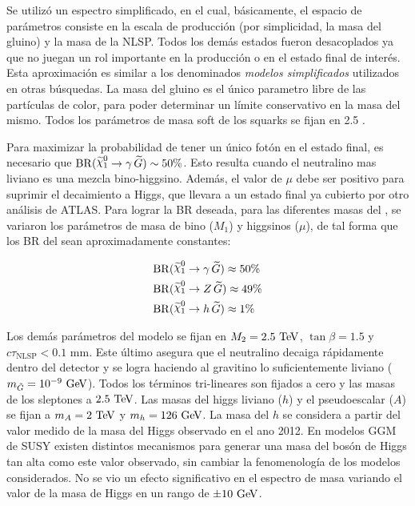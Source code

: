 
Se utilizó un espectro simplificado, en el cual, básicamente, el espacio de
parámetros consiste en la escala de producción (por simplicidad, la masa del
gluino) y la masa de la NLSP. Todos los demás estados fueron desacoplados ya que
no juegan un rol importante en la producción o en el estado final de interés.
Esta aproximación es similar a los denominados \emph{modelos simplificados}
utilizados en otras búsquedas.
La masa del gluino es el único parametro libre de las partículas de color, para
poder determinar un límite conservativo en la masa del mismo. Todos los
parámetros de masa soft de los squarks se fijan en 2.5 \tev.

Para maximizar la probabilidad de tener un único fotón en el estado final, es
necesario que $\mathrm{BR}(\ninoone \to \gam\,\gravino) \sim 50\%$. Esto resulta
cuando el neutralino mas liviano es una mezcla bino-higgsino.
Además, el valor de $\mu$ debe ser positivo para
suprimir el decaimiento a Higgs, que llevara a un estado final ya cubierto por
otro análisis de ATLAS.
Para lograr la BR
deseada, para las diferentes masas del {\ninoone}, se variaron los parámetros de
masa de bino ($M_1$) y higgsinos ($\mu$), de tal forma que los BR del {\ninoone}
sean aproximadamente constantes:

\begin{align}
  &\mathrm{BR}(\ninoone \to \gam\, \gravino) \approx 50\% \label{eq:n1_gam}\\
  &\mathrm{BR}(\ninoone \to Z\, \gravino) \approx 49\%    \label{eq:n1_z} \\
  &\mathrm{BR}(\ninoone \to h\, \gravino) \approx 1\%     \label{eq:n1_h}
\end{align}


Los demás parámetros del modelo se fijan en $M_2=2.5\tev$, $\tan\beta=1.5$ y
$c\tau_{\mathrm{NLSP}} < 0.1$ mm. Este último asegura que el neutralino decaiga
rápidamente dentro del detector y se logra haciendo al gravitino lo
suficientemente liviano ($m_{\tilde{G}}=10^{-9} \gev$). Todos los términos
tri-lineares son fijados a cero y las masas de los sleptones a $2.5 \tev$.
Las masas del higgs liviano ($h$) y el pseudoescalar ($A$) se fijan a
$m_{A} = 2 \tev$ y $m_{h} = 126 \gev$.
La masa del $h$ se considera a partir del valor
medido de la masa del Higgs observado en el ano 2012.
En modelos GGM de SUSY existen distintos
mecanismos\cite{Craig:2011yk,Auzzi:2011eu,Csaki:2012fh,Larsen:2012rq,Craig:2012hc}
para generar una masa del bosón de Higgs tan alta como este valor observado, sin
cambiar la fenomenología de los modelos considerados. No se vio un efecto
significativo en el espectro de masa variando el valor de la masa de Higgs en un
rango de $\pm 10 \gev$.


